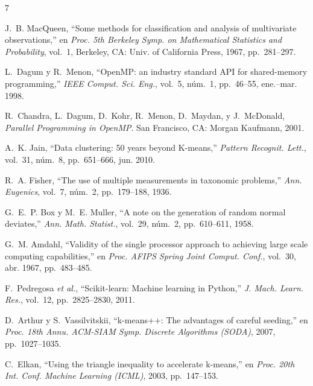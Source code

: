\documentclass[conference]{IEEEtran}
\begin{document}
\begin{thebibliography}{7}

J.~B. MacQueen,
``Some methods for classification and analysis of multivariate observations,''
en \textit{Proc. 5th Berkeley Symp. on Mathematical Statistics and
Probability}, vol.~1,
Berkeley, CA: Univ. of California Press, 1967, pp.~281--297.

L.~Dagum y R.~Menon,
``OpenMP: an industry standard API for shared-memory programming,''
\textit{IEEE Comput. Sci. Eng.},
vol.~5, n\'um.~1, pp.~46--55, ene.--mar. 1998.

R.~Chandra, L.~Dagum, D.~Kohr, R.~Menon, D.~Maydan, y J.~McDonald,
\textit{Parallel Programming in OpenMP}.
San Francisco, CA: Morgan Kaufmann, 2001.

A.~K. Jain,
``Data clustering: 50 years beyond K-means,''
\textit{Pattern Recognit. Lett.},
vol.~31, n\'um.~8, pp.~651--666, jun. 2010.

R.~A. Fisher,
``The use of multiple measurements in taxonomic problems,''
\textit{Ann. Eugenics},
vol.~7, n\'um.~2, pp.~179--188, 1936.

G.~E.~P. Box y M.~E. Muller,
``A note on the generation of random normal deviates,''
\textit{Ann. Math. Statist.},
vol.~29, n\'um.~2, pp.~610--611, 1958.

G.~M. Amdahl,
``Validity of the single processor approach to achieving large scale
computing capabilities,''
en \textit{Proc. AFIPS Spring Joint Comput. Conf.},
vol.~30, abr. 1967, pp.~483--485.

F.~Pedregosa \textit{et al.},
``Scikit-learn: Machine learning in Python,''
\textit{J. Mach. Learn. Res.},
vol.~12, pp.~2825--2830, 2011.

D.~Arthur y S.~Vassilvitskii,
``k-means++: The advantages of careful seeding,''
en \textit{Proc. 18th Annu. ACM-SIAM Symp. Discrete Algorithms (SODA)},
2007, pp.~1027--1035.

C.~Elkan,
``Using the triangle inequality to accelerate k-means,''
en \textit{Proc. 20th Int. Conf. Machine Learning (ICML)},
2003, pp.~147--153.

\end{thebibliography}
\end{document}
